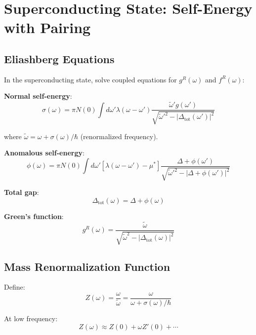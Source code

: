 \documentclass[12pt]{article}
\begin{document}
\section{Superconducting State: Self-Energy with Pairing}

\subsection{Eliashberg Equations}

In the superconducting state, solve coupled equations for $g^R(\omega)$ and $f^R(\omega)$:

\textbf{Normal self-energy}:
\begin{equation}
\boxed{
\sigma(\omega) = \pi N(0) \int d\omega' \lambda(\omega - \omega') \frac{\tilde{\omega}' g(\omega')}{\sqrt{\tilde{\omega}'^2 - |\Delta_{\text{tot}}(\omega')|^2}}
}
\end{equation}

where $\tilde{\omega} = \omega + \sigma(\omega)/\hbar$ (renormalized frequency).

\textbf{Anomalous self-energy}:
\begin{equation}
\boxed{
\phi(\omega) = \pi N(0) \int d\omega' [\lambda(\omega - \omega') - \mu^*] \frac{\Delta + \phi(\omega')}{\sqrt{\tilde{\omega}'^2 - |\Delta + \phi(\omega')|^2}}
}
\end{equation}

\textbf{Total gap}:
\begin{equation}
\boxed{
\Delta_{\text{tot}}(\omega) = \Delta + \phi(\omega)
}
\end{equation}

\textbf{Green's function}:
\begin{equation}
\boxed{
g^R(\omega) = \frac{\tilde{\omega}}{\sqrt{\tilde{\omega}^2 - |\Delta_{\text{tot}}(\omega)|^2}}
}
\end{equation}

\subsection{Mass Renormalization Function}

Define:
\begin{equation}
\boxed{
Z(\omega) = \frac{\omega}{\tilde{\omega}} = \frac{\omega}{\omega + \sigma(\omega)/\hbar}
}
\end{equation}

At low frequency:
\begin{equation}
Z(\omega) \approx Z(0) + \omega Z'(0) + \cdots
\end{equation}
\end{document}
